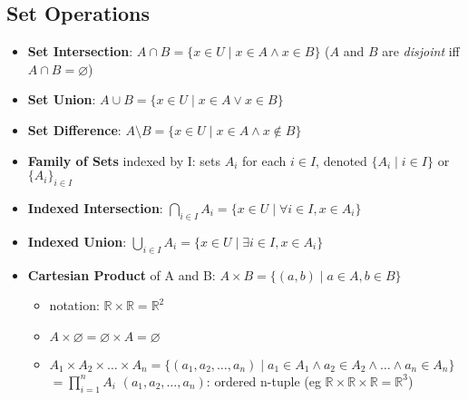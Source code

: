 \documentclass[11pt]{article}
\theoremstyle{definition}
\newcommand{\bb}[1]{\mathbb{#1}}
\begin{document}
\subsection*{Set Operations}
\begin{itemize}
    \item \textbf{Set Intersection}: $A\cap B = \{ x\in U \mid x\in A\land x\in B \}$ ($A$ and $B$ are \emph{disjoint} iff $A\cap B = \varnothing$)
    \item \textbf{Set Union}: $A\cup B = \{ x\in U \mid x\in A \lor x\in B\}$
    \item \textbf{Set Difference}: $A\setminus B = \{ x\in U\mid x\in A \land x\not\in B\}$
    \item \textbf{Family of Sets} indexed by I: sets $A_i$ for each $i\in I$, denoted $\{A_i\mid i\in I\}$ or $\{A_i\}_{i\in I}$
    \item \textbf{Indexed Intersection}: $\displaystyle \bigcap_{i\in I}A_i = \{x\in U \mid \forall i\in I, x\in A_i\}$
    \item \textbf{Indexed Union}: $\displaystyle \bigcup_{i\in I}A_i = \{x\in U \mid \exists i\in I, x\in A_i\}$
    \item \textbf{Cartesian Product} of A and B: $A\times B = \{(a,b)\mid a\in A, b\in B\}$
    \begin{itemize}
        \item notation: $\bb{R}\times\bb{R} = \bb{R}^2$
        \item $A\times \varnothing = \varnothing \times A = \varnothing$
        \item $A_1\times A_2 \times\dots\times A_n = \{(a_1, a_2,\dots,a_n)\mid a_1\in A_1 \land a_2\in A_2 \land \dots\land a_n\in A_n\}$\\
        $\displaystyle =\prod_{i=1}^{n}A_i$ $(a_1,a_2,\dots,a_n)$: ordered n-tuple (eg $\bb{R}\times\bb{R}\times\bb{R} = \bb{R}^3$)
    \end{itemize}
\end{itemize}
\newpage
\end{document}

